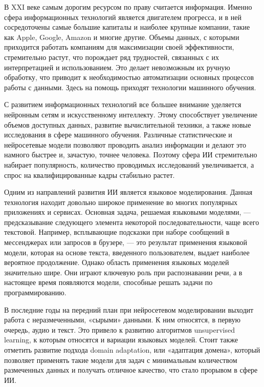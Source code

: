 \label{sec:intro}

В XXI веке самым дорогим ресурсом по праву считается информация. Именно сфера информационных технологий является двигателем прогресса, и в ней сосредоточены самые большие капиталы и наиболее крупные компании, такие как Apple, Google, Amazon и многие другие. Объемы данных, с которыми приходится работать компаниям для максимизации своей эффективности, стремительно растут, что порождает ряд трудностей, связанных с их интерпретацией и использованием. Это делает невозможным их ручную обработку, что приводит к необходимостью автоматизации основных процессов работы с данными. Здесь на помощь приходят технологии машинного обучения.

С развитием информационных технологий все большее внимание уделяется нейронным сетям и искусственному интеллекту. Этому способствует увеличение объемов доступных данных, развитие вычислительной техники, а также новые исследования в сфере машинного обучения. Различные статистические и нейросетевые модели позволяют проводить анализ информации и делают это намного быстрее и, зачастую, точнее человека. Поэтому сфера ИИ стремительно набирает популярность, количество проводимых исследований увеличивается, а спрос на квалифицированные кадры стабильно растет.

Одним из направлений развития ИИ является языковое моделирования. Данная технология находит довольно широкое применение во многих популярных приложениях и сервисах. Основная задача, решаемая языковыми моделями, --- предсказывание следующего элемента некоторой последовательности, чаще всего текстовой. Например, всплывающие подсказки при наборе сообщений в мессенджерах или запросов в брузере, --- это результат применения языковой модели, которая на основе текста, введенного пользователем, выдает наиболее вероятное продолжение. Однако область применения языковых моделей значительно шире. Они играют ключевую роль при распознавании речи, а в настоящее время появляются модели, способные решать задачи по программированию. 

В последние годы на передний план при нейросетевом моделировании выходит работа с неразмеченными, «сырыми» данными. К ним относятся, в первую очередь, аудио и текст. Это привело к развитию алгоритмов unsupervised learning, к которым относятся и вариации языковых моделей. Стоит также отметить развитие подхода domain adaptation, или «адаптация домена», который позволяет применять такие модели для задач с минимальным количеством размеченных данных и получать отличное качество, что стало прорывом в сфере ИИ.

